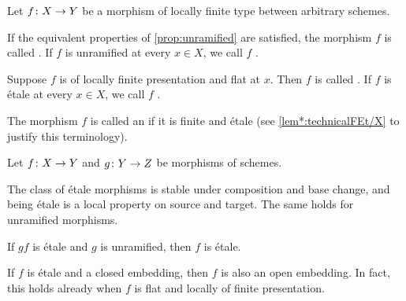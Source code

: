\begin{defi}\label{def:etale}
	Let $f\colon X\morphism Y$ be a morphism of locally finite type between arbitrary schemes.
	\begin{alphanumerate}
		\item If the equivalent properties of \cref{prop:unramified} are satisfied, the morphism $f$ is called . If $f$ is unramified at every $x\in X$, we call $f$ .
		\item Suppose $f$ is of locally finite presentation and flat at $x$. Then $f$ is called . If $f$ is étale at every $x\in X$, we call $f$ .
		\item The morphism $f$ is called an  if it is finite and étale (see \cref{lem*:technicalFEt/X} to justify this terminology).
	\end{alphanumerate}
\end{defi}
\begin{fact}\label{fact:etaleProperties}
	Let $f\colon X\morphism Y$ and $g\colon Y\morphism Z$ be morphisms of schemes.
	\begin{alphanumerate}
		\item The class of étale morphisms is stable under composition and base change, and being étale is a local property on source and target. The same holds for unramified morphisms.
		\item If $gf$ is étale and $g$ is unramified, then $f$ is étale.
		\item If $f$ is étale and a closed embedding, then $f$ is also an open embedding. In fact, this holds already when $f$ is flat and locally of finite presentation.
	\end{alphanumerate}
\end{fact}
